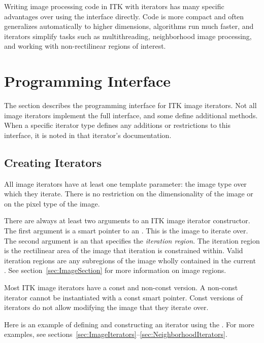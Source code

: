 Writing image processing code in ITK with iterators has many specific
advantages over using the  interface directly.  Code is more
compact and often generalizes automatically to higher dimensions, algorithms
run much faster, and iterators simplify tasks such as multithreading,
neighborhood image processing, and working with non-rectilinear regions of
interest.


\section{Programming Interface}
\label{sec:IteratorsInterface}

The section describes the programming interface for ITK image iterators.  Not
all image iterators implement the full interface, and some define additional
methods.  When a specific iterator type defines any additions or restrictions to this
interface, it is noted in that iterator's documentation.

\subsection{Creating Iterators}
\label{sec:CreatingIterators}

All image iterators have at least one template parameter: the image type over
which they iterate.  There is no restriction on the dimensionality of the image
or on the pixel type of the image.


There are always at least two arguments to an ITK image iterator constructor.
The first argument is a smart pointer to an .  This is the
image to iterate over. The second argument is an
 that specifies the \emph{iteration region}.  The
iteration region is the rectilinear area of the image that iteration is
constrained within. Valid iteration regions are any subregions of the image
wholly contained in the current .  See
section~\ref{sec:ImageSection} for more information on image regions. 


Most ITK image iterators have a const and non-const version.  A non-const
iterator cannot be instantiated with a const  smart pointer.
Const versions of iterators do not allow modifying the image that they iterate
over.

Here is an example of defining and constructing an iterator using the
.  For more examples, see
sections~\ref{sec:ImageIterators}--\ref{sec:NeighborhoodIterators}.

